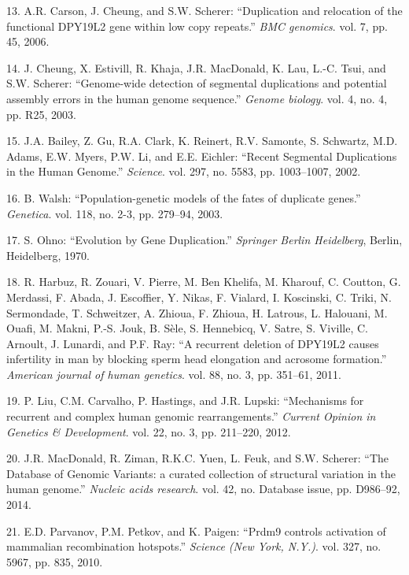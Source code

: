 \documentclass[12pt,twoside]{ugathesis}
\begin{document}
\hypertarget{ref-Carson2006}{}
13. A.R. Carson, J. Cheung, and S.W. Scherer: ``Duplication and
relocation of the functional DPY19L2 gene within low copy repeats.''
\emph{BMC genomics}. vol. 7, pp. 45, 2006.

\hypertarget{ref-Cheung2003}{}
14. J. Cheung, X. Estivill, R. Khaja, J.R. MacDonald, K. Lau, L.-C.
Tsui, and S.W. Scherer: ``Genome-wide detection of segmental
duplications and potential assembly errors in the human genome
sequence.'' \emph{Genome biology}. vol. 4, no. 4, pp. R25, 2003.

\hypertarget{ref-Bailey2002}{}
15. J.A. Bailey, Z. Gu, R.A. Clark, K. Reinert, R.V. Samonte, S.
Schwartz, M.D. Adams, E.W. Myers, P.W. Li, and E.E. Eichler: ``Recent
Segmental Duplications in the Human Genome.'' \emph{Science}. vol. 297,
no. 5583, pp. 1003--1007, 2002.

\hypertarget{ref-Walsh2003}{}
16. B. Walsh: ``Population-genetic models of the fates of duplicate
genes.'' \emph{Genetica}. vol. 118, no. 2-3, pp. 279--94, 2003.

\hypertarget{ref-Ohno1970}{}
17. S. Ohno: ``Evolution by Gene Duplication.'' \emph{Springer Berlin
Heidelberg}, Berlin, Heidelberg, 1970.

\hypertarget{ref-Harbuz2011a}{}
18. R. Harbuz, R. Zouari, V. Pierre, M. Ben Khelifa, M. Kharouf, C.
Coutton, G. Merdassi, F. Abada, J. Escoffier, Y. Nikas, F. Vialard, I.
Koscinski, C. Triki, N. Sermondade, T. Schweitzer, A. Zhioua, F. Zhioua,
H. Latrous, L. Halouani, M. Ouafi, M. Makni, P.-S. Jouk, B. Sèle, S.
Hennebicq, V. Satre, S. Viville, C. Arnoult, J. Lunardi, and P.F. Ray:
``A recurrent deletion of DPY19L2 causes infertility in man by blocking
sperm head elongation and acrosome formation.'' \emph{American journal
of human genetics}. vol. 88, no. 3, pp. 351--61, 2011.

\hypertarget{ref-Liu2012}{}
19. P. Liu, C.M. Carvalho, P. Hastings, and J.R. Lupski: ``Mechanisms
for recurrent and complex human genomic rearrangements.'' \emph{Current
Opinion in Genetics \& Development}. vol. 22, no. 3, pp. 211--220, 2012.

\hypertarget{ref-MacDonald2014}{}
20. J.R. MacDonald, R. Ziman, R.K.C. Yuen, L. Feuk, and S.W. Scherer:
``The Database of Genomic Variants: a curated collection of structural
variation in the human genome.'' \emph{Nucleic acids research}. vol. 42,
no. Database issue, pp. D986--92, 2014.

\hypertarget{ref-Parvanov2010}{}
21. E.D. Parvanov, P.M. Petkov, and K. Paigen: ``Prdm9 controls
activation of mammalian recombination hotspots.'' \emph{Science (New
York, N.Y.)}. vol. 327, no. 5967, pp. 835, 2010.
\end{document}
